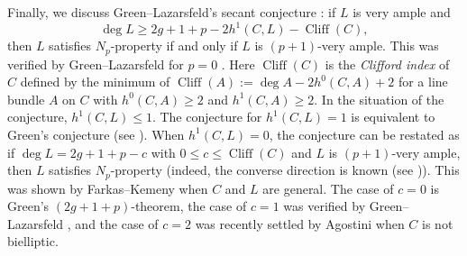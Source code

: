 \documentclass[graybox]{svmult}
\DeclareMathOperator{\Cliff}{Cliff}
\begin{document}
Finally, we discuss Green--Lazarsfeld's secant conjecture \cite[Conjecture 3.4]{GL1}: if $L$ is very ample and
$$
\deg L \geq 2g+1+p - 2h^1(C, L) - \Cliff(C),
$$
then $L$ satisfies $N_p$-property if and only if $L$ is $(p+1)$-very ample. This was verified by Green--Lazarsfeld for $p=0$ \cite[Theorem 1]{GL1}. Here $\Cliff(C)$ is the \emph{Clifford index} of $C$ defined by the minimum of  $\Cliff(A):=\deg A - 2h^0(C, A)+2$ for a line bundle $A$ on $C$ with $h^0(C, A) \geq 2$ and $h^1(C, A) \geq 2$. In the situation of the conjecture, $h^1(C, L) \leq 1$. The conjecture for $h^1(C, L)=1$ is equivalent to Green's conjecture \cite[Conjecture 5.1]{Green1} (see \cite[Proposition 4.30]{AN}). When $h^1(C, L)=0$, the conjecture can be restated as if $\deg L =2g+1+p-c$ with $0 \leq c \leq \Cliff(C)$ and $L$ is $(p+1)$-very ample, then $L$ satisfies $N_p$-property (indeed, the converse direction is known (see \cite[Theorem 4.37]{AN})). This was shown by Farkas--Kemeny \cite{FK1} when $C$ and $L$ are general. The case of $c=0$ is Green's $(2g+1+p)$-theorem,  the case of $c=1$ was verified by Green--Lazarsfeld \cite[Theorem 1.2]{GL2}, and the case of $c=2$ was recently settled by Agostini \cite{Agostini2} when $C$ is not bielliptic. 
\end{document}
